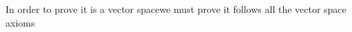 \documentclass[preview]{standalone}
\begin{document}
\begin{center}
In order to prove it is a vector spacewe must prove it follows all the vector space axioms
\end{center}
\end{document}
